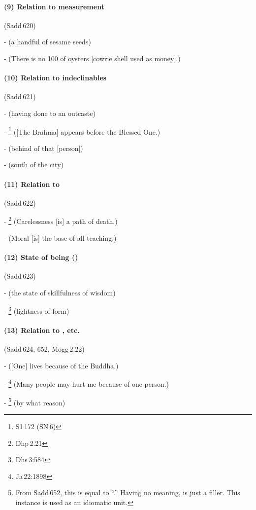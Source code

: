 \paragraph*{(9) Relation to measurement} (Sadd\,620)\par
-  (a handful of sesame seeds)\par
-  (There is no 100 of oysters [cowrie shell used as money].)\par

\paragraph*{(10) Relation to indeclinables} (Sadd\,621)\par
-  (having done to an outcaste)\par
- \footnote{S1\,172 (SN\,6)} ([The Brahma] appears before the Blessed One.)\par
-  (behind of that [person])\par
-  (south of the city)\par

\paragraph*{(11) Relation to } (Sadd\,622)\par
- \footnote{Dhp\,2.21} (Carelessness [is] a path of death.)\par
-  (Moral [is] the base of all teaching.)\par

\paragraph*{(12) State of being ()} (Sadd\,623)\par
-  (the state of skillfulness of wisdom)\par
- \footnote{Dhs\,3:584} (lightness of form)\par

\paragraph*{(13) Relation to , etc.} (Sadd\,624, 652, Mogg\,2.22)\par
-  ([One] lives because of the Buddha.)\par
- \footnote{Ja\,22:1898} (Many people may hurt me because of one person.)\par
- \footnote{From Sadd\,652, this is equal to ``.'' Having no meaning,  is just a filler. This instance is used as an idiomatic unit.} (by what reason)\par


